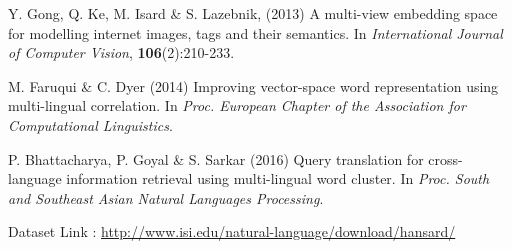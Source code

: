\documentclass{article} %
\begin{document}
	
	
	
	
	
	
	\begin{thebibliography}{1}
		
		Y. Gong, Q. Ke, M. Isard \& S. Lazebnik, (2013) A multi-view embedding space for modelling internet images, tags and their semantics. In {\it International Journal of Computer Vision}, {\bf 106}(2):210-233.
		
		M. Faruqui \& C. Dyer (2014) Improving vector-space word representation using multi-lingual correlation. In {\it Proc. European Chapter of the Association for Computational Linguistics}.
		
		P. Bhattacharya, P. Goyal \& S. Sarkar (2016) Query translation for cross-language information retrieval using multi-lingual word cluster. In {\it Proc. South and Southeast Asian Natural Languages Processing}.
		
		Dataset Link : \url{http://www.isi.edu/natural-language/download/hansard/}
		
	\end{thebibliography}
	
	
\end{document}
